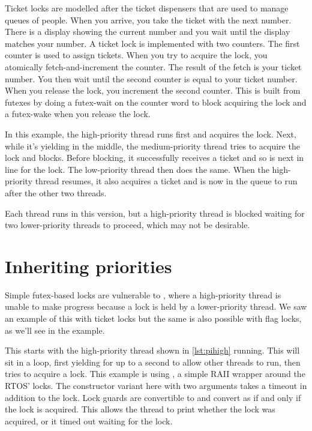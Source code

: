 Ticket locks are modelled after the ticket dispensers that are used to manage queues of people.
When you arrive, you take the ticket with the next number.
There is a display showing the current number and you wait until the display matches your number.
A ticket lock is implemented with two counters.
The first counter is used to assign tickets.
When you try to acquire the lock, you atomically fetch-and-increment the counter.
The result of the fetch is your ticket number.
You then wait until the second counter is equal to your ticket number.
When you release the lock, you increment the second counter.
This is built from futexes by doing a futex-wait on the counter word to block acquiring the lock and a futex-wake when you release the lock.

In this example, the high-priority thread runs first and acquires the lock.
Next, while it's yielding in the middle, the medium-priority thread tries to acquire the lock and blocks.
Before blocking, it successfully receives a ticket and so is next in line for the lock.
The low-priority thread then does the same.
When the high-priority thread resumes, it also acquires a ticket and is now in the queue to run after the other two threads.

Each thread runs in this version, but a high-priority thread is blocked waiting for two lower-priority threads to proceed, which may not be desirable.

\section[label=priority_inheritance]{Inheriting priorities}

Simple futex-based locks are vulnerable to , where a high-priority thread is unable to make progress because a lock is held by a lower-priority thread.
We saw an example of this with ticket locks but the same is also possible with flag locks, as we'll see in the  example.

This starts with the high-priority thread shown in \ref{lst:pihigh} running.
This will sit in a loop, first yielding for up to a second to allow other threads to run, then tries to acquire a lock.
This example is using , a simple RAII wrapper around the RTOS' locks.
The constructor variant here with two arguments takes a timeout in addition to the lock.
Lock guards are convertible to  and convert as  if and only if the lock is acquired.
This allows the thread to print whether the lock was acquired, or it timed out waiting for the lock.

